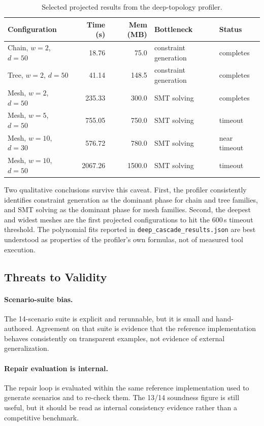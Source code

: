 \documentclass[10pt,twocolumn]{article}
\begin{document}
\begin{table}[t]
\centering
\caption{Selected projected results from the deep-topology profiler.}
\label{tab:deep_projection}
\small
\begin{tabular}{@{}lrrll@{}}
\toprule
\textbf{Configuration} & \textbf{Time (s)} & \textbf{Mem (MB)} & \textbf{Bottleneck} & \textbf{Status} \\
\midrule
Chain, $w=2$, $d=50$ & 18.76 & 75.0 & constraint generation & completes \\
Tree, $w=2$, $d=50$  & 41.14 & 148.5 & constraint generation & completes \\
Mesh, $w=2$, $d=50$  & 235.33 & 300.0 & SMT solving & completes \\
Mesh, $w=5$, $d=50$  & 755.05 & 750.0 & SMT solving & timeout \\
Mesh, $w=10$, $d=30$ & 576.72 & 780.0 & SMT solving & near timeout \\
Mesh, $w=10$, $d=50$ & 2067.26 & 1500.0 & SMT solving & timeout \\
\bottomrule
\end{tabular}
\end{table}

Two qualitative conclusions survive this caveat.  First, the profiler
consistently identifies constraint generation as the dominant phase for chain
and tree families, and SMT solving as the dominant phase for mesh families.
Second, the deepest and widest meshes are the first projected configurations to
hit the 600\,s timeout threshold.  The polynomial fits reported in
\texttt{deep\_cascade\_results.json} are best understood as properties of the
profiler's own formulas, not of measured tool execution.

\subsection{Threats to Validity}

\paragraph{Scenario-suite bias.}
The 14-scenario suite is explicit and rerunnable, but it is small and
hand-authored.  Agreement on that suite is evidence that the reference
implementation behaves consistently on transparent examples, not evidence of
external generalization.

\paragraph{Repair evaluation is internal.}
The repair loop is evaluated within the same reference implementation used to
generate scenarios and to re-check them.  The 13/14 soundness figure is still
useful, but it should be read as internal consistency evidence rather than a
competitive benchmark.
\end{document}
